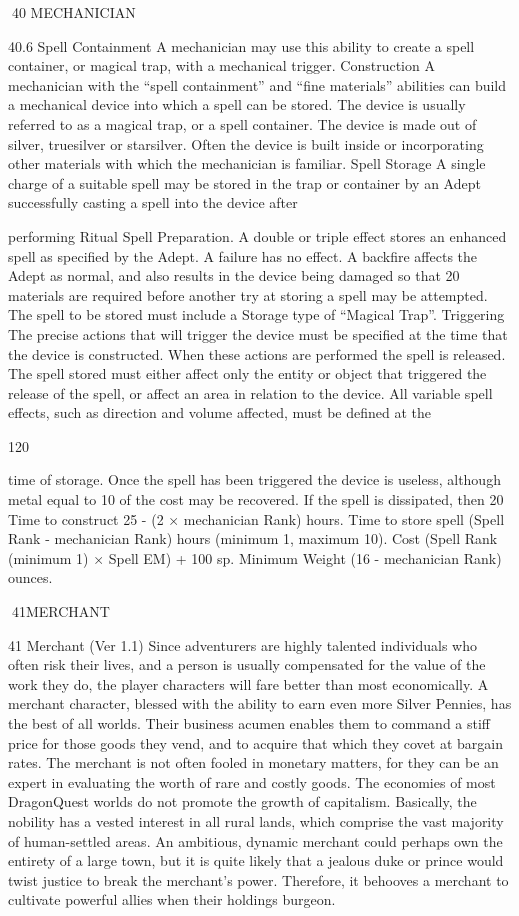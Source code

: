 \documentclass[a4paper]{article}
\begin{document}
\begin{multicols}{3}
40 MECHANICIAN

40.6 Spell Containment
A mechanician may use this ability to create a spell
container, or magical trap, with a mechanical trigger.
Construction A mechanician with the “spell containment” and “fine materials” abilities can build a
mechanical device into which a spell can be stored.
The device is usually referred to as a magical trap,
or a spell container. The device is made out of
silver, truesilver or starsilver. Often the device is
built inside or incorporating other materials with
which the mechanician is familiar.
Spell Storage A single charge of a suitable spell
may be stored in the trap or container by an Adept
successfully casting a spell into the device after

performing Ritual Spell Preparation. A double or
triple effect stores an enhanced spell as specified
by the Adept. A failure has no effect. A backfire
affects the Adept as normal, and also results in the
device being damaged so that 20%
materials are required before another try at storing
a spell may be attempted. The spell to be stored
must include a Storage type of “Magical Trap”.
Triggering The precise actions that will trigger the
device must be specified at the time that the device
is constructed. When these actions are performed
the spell is released. The spell stored must either
affect only the entity or object that triggered the
release of the spell, or affect an area in relation to
the device. All variable spell effects, such as direction and volume affected, must be defined at the

120

time of storage. Once the spell has been triggered
the device is useless, although metal equal to 10%
of the cost may be recovered. If the spell is dissipated, then 20%
Time to construct 25 - (2 × mechanician Rank)
hours.
Time to store spell (Spell Rank - mechanician
Rank) hours (minimum 1, maximum 10).
Cost (Spell Rank (minimum 1) × Spell EM) + 100
sp.
Minimum Weight (16 - mechanician Rank)
ounces.

41MERCHANT

41 Merchant (Ver 1.1)
Since adventurers are highly talented individuals
who often risk their lives, and a person is usually
compensated for the value of the work they do, the
player characters will fare better than most economically. A merchant character, blessed with the
ability to earn even more Silver Pennies, has the
best of all worlds. Their business acumen enables
them to command a stiff price for those goods they
vend, and to acquire that which they covet at bargain rates. The merchant is not often fooled in
monetary matters, for they can be an expert in
evaluating the worth of rare and costly goods.
The economies of most DragonQuest worlds do
not promote the growth of capitalism. Basically,
the nobility has a vested interest in all rural lands,
which comprise the vast majority of human-settled
areas. An ambitious, dynamic merchant could
perhaps own the entirety of a large town, but it is
quite likely that a jealous duke or prince would
twist justice to break the merchant’s power. Therefore, it behooves a merchant to cultivate powerful
allies when their holdings burgeon.


\end{multicols}
\end{document}
